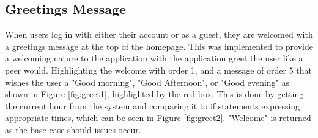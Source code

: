 \documentclass{l4proj}
\begin{document}
\subsection{Greetings Message}
When users log in with either their account or as a guest,  they are welcomed with a greetings message at the top of the homepage. This was implemented to provide a welcoming nature to the application with the application greet the user like a peer would. Highlighting the welcome with order 1,  and a message of order 5 that wishes the user a "Good morning",  "Good Afternoon",  or "Good evening" as shown in Figure \ref{fig:greet1},  highlighted by the red box. This is done by getting the current hour from the system and comparing it to if statements expressing appropriate times,  which can be seen in Figure \ref{fig:greet2}. "Welcome" is returned as the base case should issues occur.
\end{document}
